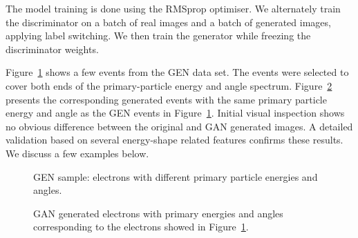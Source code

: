 The model training is done using the RMSprop \cite{rmsProp} optimiser. We alternately train the discriminator on a batch of real images and a batch of generated images, applying label switching. We then train the generator while freezing the discriminator weights.

Figure~\ref{fig:GEANT4_events} shows a few events from the GEN data set. The events were selected to cover both ends of the primary-particle energy and angle spectrum. Figure~\ref{fig:GAN_events} presents the corresponding generated events with the same primary particle energy and angle as the GEN events in Figure~\ref{fig:GEANT4_events}. Initial visual inspection shows no obvious difference between the original and GAN generated images. A detailed validation based on several energy-shape related features confirms these results. We discuss a few examples below.

\begin{figure}[htbp]
    \caption{GEN sample: electrons with different primary particle energies and angles.}
    \label{fig:GEANT4_events}
\end{figure}

\begin{figure}[htbp]
    \caption{GAN generated electrons with primary energies and angles corresponding to the electrons showed in Figure~\ref{fig:GEANT4_events}.}
    \label{fig:GAN_events}
\end{figure}

